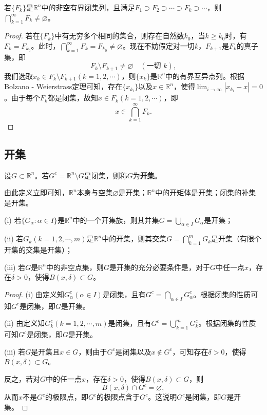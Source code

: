\documentclass[../../main.tex]{subfiles}
\begin{document}
\begin{theorem}[Cantor闭集套定理]\label{theorem:Cantor闭集套定理}
若\(\{F_k\}\)是\(\mathbb{R}^n\)中的非空有界闭集列，且满足\(F_1\supset F_2\supset\cdots\supset F_k\supset\cdots\)，则\(\bigcap_{k = 1}^{\infty}F_k\neq\varnothing\)。
\end{theorem}
\begin{proof}
  若在\(\{F_k\}\)中有无穷多个相同的集合，则存在自然数\(k_0\)，当\(k\geqslant k_0\)时，有\(F_k = F_{k_0}\)。此时，\(\bigcap_{k = 1}^{\infty}F_k = F_{k_0}\neq\varnothing\)。现在不妨假定对一切\(k\)，\(F_{k + 1}\)是\(F_k\)的真子集，即
\[F_k\setminus F_{k + 1}\neq\varnothing\quad (\text{一切 }k),\]
我们选取\(x_k\in F_k\setminus F_{k + 1}(k = 1,2,\cdots)\)，则\(\{x_k\}\)是\(\mathbb{R}^n\)中的有界互异点列。根据Bolzano - Weierstrass定理可知，存在\(\{x_{k_i}\}\)以及\(x\in\mathbb{R}^n\)，使得\(\lim_{i\rightarrow\infty}|x_{k_i}-x| = 0\)。由于每个\(F_k\)都是闭集，故知\(x\in F_k(k = 1,2,\cdots)\)，即
\[x\in\bigcap_{k = 1}^{\infty}F_k.\]
\end{proof}

\subsection{开集}

\begin{definition}[开集]\label{definition:开集}
设\(G\subset\mathbb{R}^n\)。若\(G^c=\mathbb{R}^n\setminus G\)是闭集，则称\(G\)为\textbf{开集}。
\end{definition}
\begin{note}
由此定义立即可知，\(\mathbb{R}^n\)本身与空集\(\varnothing\)是开集；\(\mathbb{R}^n\)中的开矩体是开集；闭集的补集是开集。
\end{note}

\begin{theorem}[开集的运算性质]\label{theorem:开集的运算性质}
(i) 若\(\{G_{\alpha}:\alpha\in I\}\)是\(\mathbb{R}^n\)中的一个开集族，则其并集\(G = \bigcup_{\alpha\in I}G_{\alpha}\)是开集；

(ii) 若\(G_k(k = 1,2,\cdots,m)\)是\(\mathbb{R}^n\)中的开集，则其交集\(G=\bigcap_{k = 1}^{m}G_k\)是开集（有限个开集的交集是开集）；

(iii) 若\(G\)是\(\mathbb{R}^n\)中的非空点集，则\(G\)是开集的充分必要条件是，对于\(G\)中任一点\(x\)，存在\(\delta>0\)，使得\(B(x,\delta)\subset G\)。
\end{theorem}
\begin{proof}
  (i) 由定义知\(G_{\alpha}^c(\alpha\in I)\)是闭集，且有\(G^c=\bigcap_{\alpha\in I}G_{\alpha}^c\)。根据闭集的性质可知\(G^c\)是闭集，即\(G\)是开集。

(ii) 由定义知\(G_k^c(k = 1,2,\cdots,m)\)是闭集，且有\(G^c=\bigcup_{k = 1}^{m}G_k^c\)。根据闭集的性质可知\(G^c\)是闭集，即\(G\)是开集。

(iii) 若\(G\)是开集且\(x\in G\)，则由于\(G^c\)是闭集以及\(x\notin G^c\)，可知存在\(\delta>0\)，使得\(B(x,\delta)\subset G\)。

反之，若对\(G\)中的任一点\(x\)，存在\(\delta>0\)，使得\(B(x,\delta)\subset G\)，则
\[B(x,\delta)\cap G^c=\varnothing,\]
从而\(x\)不是\(G^c\)的极限点，即\(G^c\)的极限点含于\(G^c\)。这说明\(G^c\)是闭集，即\(G\)是开集。
\end{proof}
\end{document}
